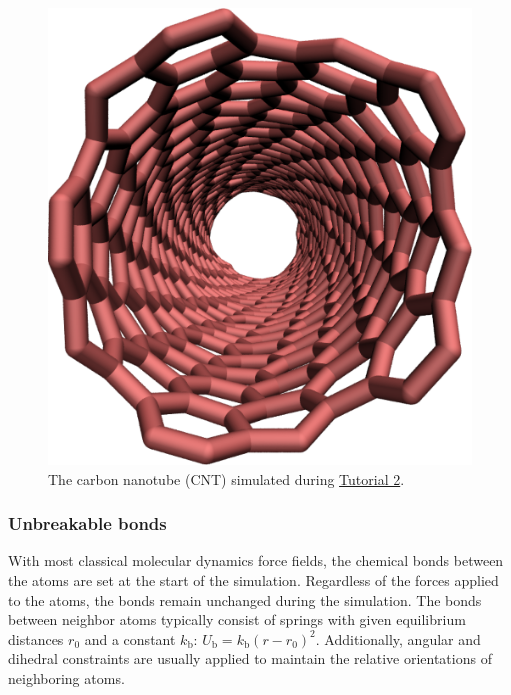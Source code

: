 \documentclass[9pt,tutorial]{livecoms}
\begin{document}
\begin{figure}
\centering
\includegraphics[width=0.55\linewidth]{CNT}
\caption{The carbon nanotube (CNT) simulated during
\hyperref[carbon-nanotube-label]{Tutorial 2}.}
\label{fig:CNT}
\end{figure}

\subsubsection{Unbreakable bonds}
With most classical molecular dynamics force fields, the chemical bonds
between the atoms are set at the start of the simulation. Regardless of
the forces applied to the atoms, the bonds remain unchanged during the
simulation. The bonds between neighbor atoms typically consist of
springs with given equilibrium distances $r_0$ and a constant
$k_\text{b}$: $U_\text{b} = k_\text{b} \left( r - r_0
\right)^2$. Additionally, angular and dihedral constraints are usually
applied to maintain the relative orientations of neighboring atoms.
\end{document}
